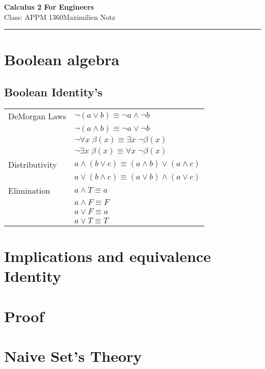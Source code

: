 \documentclass[5pt]{article}
\begin{document}
\begin{center}
     \Large{\textbf{Calculus 2 For Engineers}}\\
     \small{Class: APPM 1360}\hfill\small{\textcopyright Maximilien Notz \the\year{}}
     \noindent\rule{20.2cm}{0.4pt}
\end{center}


\begin{multicols}{2}
\setcounter{secnumdepth}{0}


\section{Boolean algebra}
\subsection{Boolean Identity's}
\begin{tabular}{ll}
    DeMorgan Laws    & $\lnot(a\lor b)\equiv \lnot a\land\lnot b$\\
                     & $\lnot(a\land b)\equiv \lnot a\lor\lnot b$\\
                     & $\lnot\forall x\;\beta(x)\equiv\exists x\;\lnot\beta(x) $\\
                     & $\lnot\exists x\;\beta(x)\equiv\forall x\;\lnot\beta(x) $\\
    Distributivity   & $a\land(b\lor c)\equiv(a\land b)\lor(a\land c)$\\
                     & $a\lor(b\land c)\equiv(a\lor b)\land(a\lor c)$\\
    Elimination      & $a\land T\equiv a$\\
                     & $a\land F\equiv F$\\
                     & $a\lor F\equiv a$\\
                     & $a\lor T\equiv T$\\
\end{tabular}

\section{Implications and equivalence Identity}

\section{Proof}

\section{Naive Set's Theory}

\end{multicols}
\end{document}
